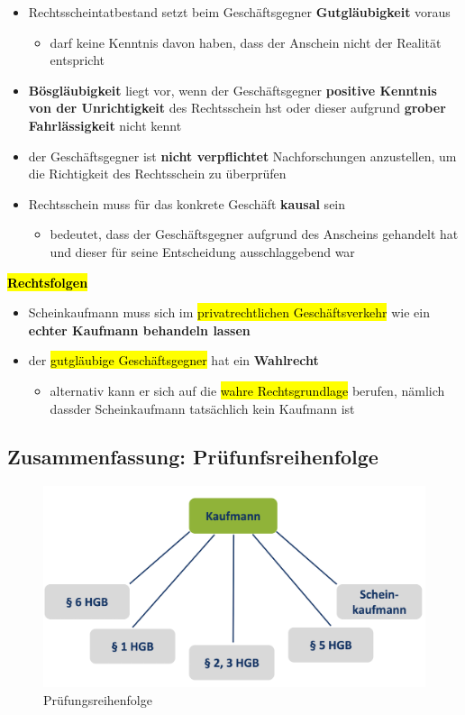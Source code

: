 \documentclass[a4paper, 10pt]{article}
\begin{document}
\begin{itemize}
    \item Rechtsscheintatbestand setzt beim Geschäftsgegner \textbf{Gutgläubigkeit} voraus
    \begin{itemize}
        \item darf keine Kenntnis davon haben, dass der Anschein nicht der Realität entspricht
    \end{itemize}

    \item \textbf{Bösgläubigkeit} liegt vor, wenn der Geschäftsgegner \textbf{positive Kenntnis von der Unrichtigkeit} des Rechtsschein hst oder dieser aufgrund \textbf{grober Fahrlässigkeit} nicht kennt 

    \item der Geschäftsgegner ist \textbf{nicht verpflichtet} Nachforschungen anzustellen, um die Richtigkeit des Rechtsschein zu überprüfen

    \item Rechtsschein muss für das konkrete Geschäft \textbf{kausal} sein
    \begin{itemize}
        \item bedeutet, dass der Geschäftsgegner aufgrund des Anscheins gehandelt hat und dieser für seine Entscheidung ausschlaggebend war
    \end{itemize}
\end{itemize}
\textbf{\hl{Rechtsfolgen}}
\begin{itemize}
    \item Scheinkaufmann muss sich im \hl{privatrechtlichen Geschäftsverkehr} wie ein \textbf{echter Kaufmann behandeln lassen}
    \item der \hl{gutgläubige Geschäftsgegner} hat ein \textbf{Wahlrecht}
    \begin{itemize}
        \item alternativ kann er sich auf die \hl{wahre Rechtsgrundlage} berufen, nämlich dassder Scheinkaufmann tatsächlich kein Kaufmann ist 
    \end{itemize}
\end{itemize}

\subsection{Zusammenfassung: Prüfunfsreihenfolge}
\begin{figure}[h]
    \centering
    \includegraphics[width=0.5\linewidth]{Bildschirmfoto 2024-10-30 um 17.05.46.png}
    \caption{Prüfungsreihenfolge}
    \label{fig:enter-label}
\end{figure}
\end{document}
